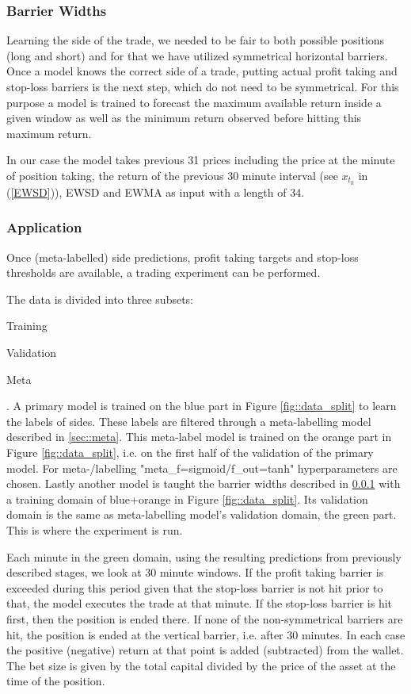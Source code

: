 \documentclass{article}
\begin{document}
\subsubsection{Barrier Widths}\label{sec::barr_widths}
Learning the side of the trade, we needed to be fair to both possible positions (long and short) and for that we have utilized symmetrical horizontal barriers. Once a model knows the correct side of a trade, putting actual profit taking and stop-loss barriers is the next step, which do not need to be symmetrical. For this purpose a model is trained to forecast the maximum available return inside a given window as well as the minimum return observed before hitting this maximum return.

In our case the model takes previous 31 prices including the price at the minute of position taking, the return of the previous 30 minute interval (see $x_{t_k}$ in (\ref{EWSD})), EWSD and EWMA as input with a length of 34.

\subsubsection{Application}\label{sec::application}
Once (meta-labelled) side predictions, profit taking targets and stop-loss thresholds are available, a trading experiment can be performed.

The data is divided into three subsets: 
\begin{enumerate*}
    \item Training
    \item Validation
    \item Meta
\end{enumerate*}.
A primary model is trained on the blue part in Figure \ref{fig::data_split} to learn the labels of sides. These labels are filtered through a meta-labelling model described in \ref{sec::meta}.
This meta-label model is trained on the orange part in Figure \ref{fig::data_split}, i.e. on the first half of the validation of the primary model. For meta-/labelling "meta\_f=sigmoid/f\_out=tanh" hyperparameters are chosen. Lastly another model is taught the barrier widths described in \ref{sec::barr_widths} with a training domain of blue+orange in Figure \ref{fig::data_split}. Its validation domain is the same as meta-labelling model's validation domain, the green part. This is where the experiment is run.

Each minute in the green domain, using the resulting predictions from previously described stages, we look at 30 minute windows. If the profit taking barrier is exceeded during this period given that the stop-loss barrier is not hit prior to that, the model executes the trade at that minute. If the stop-loss barrier is hit first, then the position is ended there. If none of the non-symmetrical barriers are hit, the position is ended at the vertical barrier, i.e. after 30 minutes. In each case the positive (negative) return at that point is added (subtracted) from the wallet. The bet size is given by the total capital divided by the price of the asset at the time of the position. 
\end{document}
